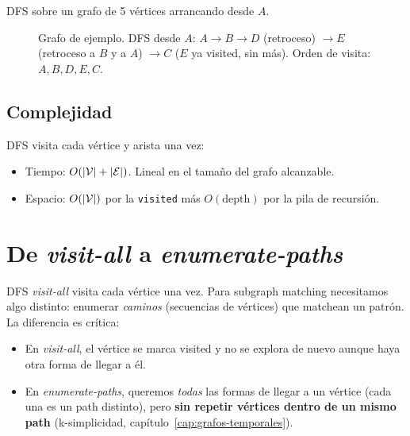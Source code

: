 \begin{ejemplo}
DFS sobre un grafo de 5 vértices arrancando desde \(A\).

\begin{figure}[H]
\centering
{}
\caption{Grafo de ejemplo. DFS desde \(A\): \(A \to B \to D\)
(retroceso) \(\to E\) (retroceso a \(B\) y a \(A\)) \(\to C\)
(\(E\) ya visited, sin más). Orden de visita: \(A, B, D, E, C\).}
\label{fig:dfs-ejemplo}
\end{figure}
\end{ejemplo}

\subsection{Complejidad}

DFS visita cada vértice y arista una vez:
\begin{itemize}
    \item Tiempo: \(O(|\mathcal{V}| + |\mathcal{E}|)\). Lineal en el tamaño del grafo
    alcanzable.
    \item Espacio: \(O(|\mathcal{V}|)\) por la \texttt{visited} más
    \(O(\text{depth})\) por la pila de recursión.
\end{itemize}

\section{De \emph{visit-all} a \emph{enumerate-paths}}

DFS \emph{visit-all} visita cada vértice una vez. Para subgraph
matching necesitamos algo distinto: enumerar \emph{caminos}
(secuencias de vértices) que matchean un patrón. La diferencia es
crítica:

\begin{itemize}
    \item En \emph{visit-all}, el vértice se marca visited y no se
    explora de nuevo aunque haya otra forma de llegar a él.
    \item En \emph{enumerate-paths}, queremos \emph{todas} las formas
    de llegar a un vértice (cada una es un path distinto), pero
    \textbf{sin repetir vértices dentro de un mismo path}
    (k-simplicidad, capítulo~\ref{cap:grafos-temporales}).
\end{itemize}


